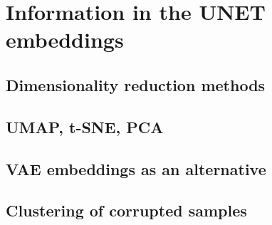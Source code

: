 \section{Information in the UNET embeddings}
    \subsection{Dimensionality reduction methods}
    \subsection{UMAP, t-SNE, PCA}
    \subsection{VAE embeddings as an alternative}
    \subsection{Clustering of corrupted samples}